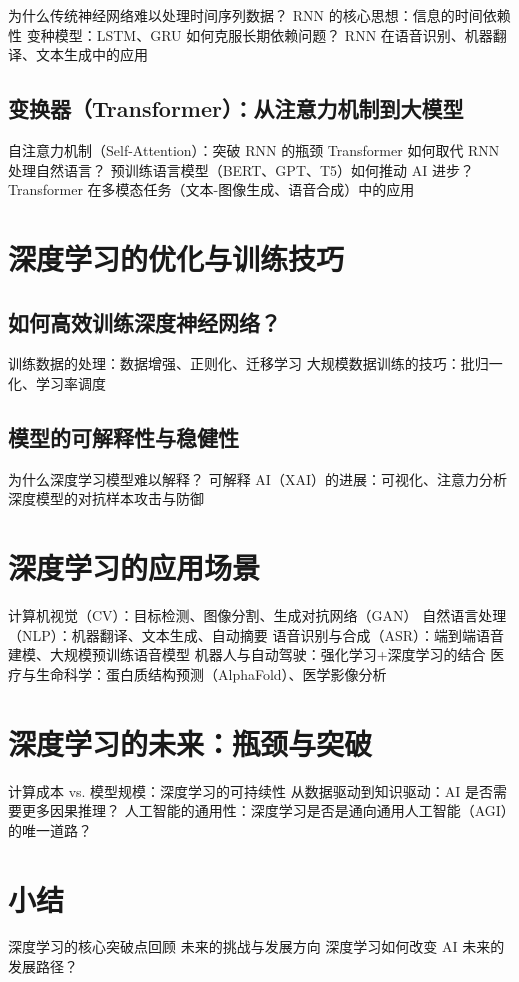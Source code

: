 为什么传统神经网络难以处理时间序列数据？
RNN 的核心思想：信息的时间依赖性
变种模型：LSTM、GRU 如何克服长期依赖问题？
RNN 在语音识别、机器翻译、文本生成中的应用
\subsection{变换器（Transformer）：从注意力机制到大模型}

自注意力机制（Self-Attention）：突破 RNN 的瓶颈
Transformer 如何取代 RNN 处理自然语言？
预训练语言模型（BERT、GPT、T5）如何推动 AI 进步？
Transformer 在多模态任务（文本-图像生成、语音合成）中的应用

\section{深度学习的优化与训练技巧}
\subsection{如何高效训练深度神经网络？}

训练数据的处理：数据增强、正则化、迁移学习
大规模数据训练的技巧：批归一化、学习率调度
\subsection{模型的可解释性与稳健性}

为什么深度学习模型难以解释？
可解释 AI（XAI）的进展：可视化、注意力分析
深度模型的对抗样本攻击与防御


\section{深度学习的应用场景}
计算机视觉（CV）：目标检测、图像分割、生成对抗网络（GAN）
自然语言处理（NLP）：机器翻译、文本生成、自动摘要
语音识别与合成（ASR）：端到端语音建模、大规模预训练语音模型
机器人与自动驾驶：强化学习+深度学习的结合
医疗与生命科学：蛋白质结构预测（AlphaFold）、医学影像分析

\section{深度学习的未来：瓶颈与突破}
计算成本 vs. 模型规模：深度学习的可持续性
从数据驱动到知识驱动：AI 是否需要更多因果推理？
人工智能的通用性：深度学习是否是通向通用人工智能（AGI）的唯一道路？

\section{小结}
深度学习的核心突破点回顾
未来的挑战与发展方向
深度学习如何改变 AI 未来的发展路径？
